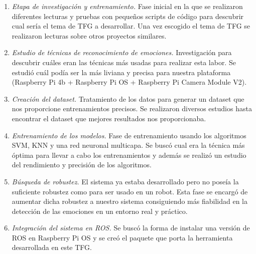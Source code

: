 \begin{enumerate}
    \item \textit{Etapa de investigación y entrenamiento.} Fase inicial en la que se realizaron diferentes lecturas y pruebas con pequeños scripts de código para descubrir cual sería el tema de TFG a desarrollar. Una vez escogido el tema de TFG se realizaron lecturas sobre otros proyectos similares.
    
    \item \textit{Estudio de técnicas de reconocimiento de emociones.} Investigación para descubrir cuáles eran las técnicas más usadas para realizar esta labor. Se estudió cuál podía ser la más liviana y precisa para nuestra plataforma (Raspberry Pi 4b + Raspberry Pi OS + Raspberry Pi Camera Module V2).
    
    \item \textit{Creación del dataset.} Tratamiento de los datos para generar un dataset que nos proporcione entrenamientos precisos. Se realizaron diversos estudios hasta encontrar el dataset que mejores resultados nos proporcionaba.
    
    \item \textit{Entrenamiento de los modelos.} Fase de entrenamiento usando los algoritmos SVM, KNN y una red neuronal multicapa. Se buscó cual era la técnica más óptima para llevar a cabo los entrenamientos y además se realizó un estudio del rendimiento y precisión de los algoritmos.
    
    \item \textit{Búsqueda de robustez.} El sistema ya estaba desarrollado pero no poseía la suficiente robustez como para ser usado en un robot. Esta fase se encargó de aumentar dicha robustez a nuestro sistema consiguiendo más fiabilidad en la detección de las emociones en un entorno real y práctico.
    
    \item \textit{Integración del sistema en ROS.} Se buscó la forma de instalar una versión de ROS en Raspberry Pi OS y se creó el paquete que porta la herramienta desarrollada en este TFG.
\end{enumerate}
